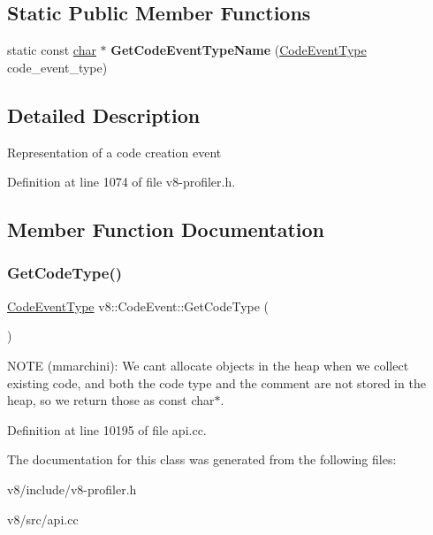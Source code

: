 \subsection*{Static Public Member Functions}
\begin{DoxyCompactItemize}
\item 
\mbox{\label{classv8_1_1CodeEvent_a7f37ec3b38dd16582135eb6a1871c57e}} 
static const \mbox{\hyperlink{classchar}{char}} $\ast$ {\bfseries Get\+Code\+Event\+Type\+Name} (\mbox{\hyperlink{namespacev8_af0ff31131cc32ced9b5279b321569bbc}{Code\+Event\+Type}} code\+\_\+event\+\_\+type)
\end{DoxyCompactItemize}


\subsection{Detailed Description}
Representation of a code creation event 

Definition at line 1074 of file v8-\/profiler.\+h.



\subsection{Member Function Documentation}
\mbox{\label{classv8_1_1CodeEvent_a3a6507024df2e1e0898c03bc35bbd293}} 
\subsubsection{\texorpdfstring{Get\+Code\+Type()}{GetCodeType()}}
{\footnotesize\ttfamily \mbox{\hyperlink{namespacev8_af0ff31131cc32ced9b5279b321569bbc}{Code\+Event\+Type}} v8\+::\+Code\+Event\+::\+Get\+Code\+Type (\begin{DoxyParamCaption}{ }\end{DoxyParamCaption})}

N\+O\+TE (mmarchini)\+: We can\textquotesingle{}t allocate objects in the heap when we collect existing code, and both the code type and the comment are not stored in the heap, so we return those as const char$\ast$. 

Definition at line 10195 of file api.\+cc.



The documentation for this class was generated from the following files\+:\begin{DoxyCompactItemize}
\item 
v8/include/v8-\/profiler.\+h\item 
v8/src/api.\+cc\end{DoxyCompactItemize}
